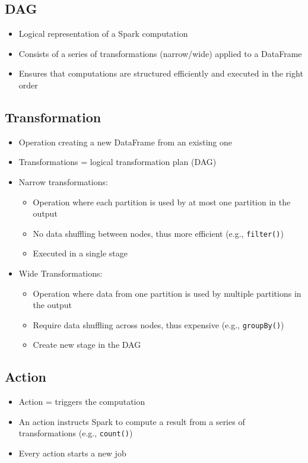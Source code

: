 \documentclass[11pt]{scrartcl}
\begin{document}
\subsection{DAG}
\begin{itemize}
	\item Logical representation of a Spark computation
	\item Consists of a series of transformations (narrow/wide) applied to a DataFrame
	\item Ensures that computations are structured efficiently and executed in the right order
\end{itemize}

\subsection{Transformation}
\begin{itemize}
	\item Operation creating a new DataFrame from an existing one
	\item Transformations = logical transformation plan (DAG)
	\item Narrow transformations:
	\begin{itemize}
		\item Operation where each partition is used by at most one partition in the output
		\item No data shuffling between nodes, thus more efficient (e.g., \texttt{filter()})
		\item Executed in a single stage
	\end{itemize}
	\item Wide Transformations:
	\begin{itemize}
		\item Operation where data from one partition is used by multiple partitions in the output
		\item Require data shuffling across nodes, thus expensive (e.g., \texttt{groupBy()})
		\item Create new stage in the DAG
	\end{itemize}
\end{itemize}

\subsection{Action}
\begin{itemize}
	\item Action = triggers the computation
	\item An action instructs Spark to compute a result from a series of transformations (e.g., \texttt{count()})
	\item Every action starts a new job
\end{itemize}
\end{document}
